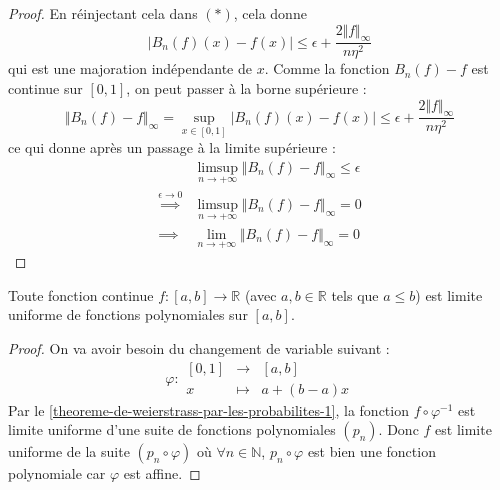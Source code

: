 \begin{proof}
    En réinjectant cela dans $(*)$, cela donne
    \[ |B_n(f)(x) - f(x)| \leq \epsilon + \frac{2 \Vert f \Vert_\infty}{n \eta^2} \]
    qui est une majoration indépendante de $x$. Comme la fonction $B_n(f) - f$ est continue sur $[0, 1]$, on peut passer à la borne supérieure :
    \[ \Vert B_n(f) - f \Vert_\infty = \sup_{x \in [0, 1]} |B_n(f)(x) - f(x)| \leq \epsilon + \frac{2 \Vert f \Vert_\infty}{n \eta^2} \]
    ce qui donne après un passage à la limite supérieure :
    \begin{align*}
      &\limsup_{n \rightarrow +\infty} \Vert B_n(f) - f \Vert_\infty \leq \epsilon \\
      \overset{\epsilon \longrightarrow 0}{\implies} &\limsup_{n \rightarrow +\infty} \Vert B_n(f) - f \Vert_\infty = 0 \\
      \implies &\lim_{n \rightarrow +\infty} \Vert B_n(f) - f \Vert_\infty = 0
    \end{align*}
  \end{proof}

  \begin{theorem}
    Toute fonction continue $f : [a,b] \rightarrow \mathbb{R}$ (avec $a, b \in \mathbb{R}$ tels que $a \leq b$) est limite uniforme de fonctions polynomiales sur $[a, b]$.
  \end{theorem}

  \begin{proof}
    On va avoir besoin du changement de variable suivant :
    \[ \varphi :
    \begin{array}{ccc}
      [0,1] &\rightarrow& [a, b] \\
      x &\mapsto& a + (b-a) x
    \end{array}
    \]
    Par le \cref{theoreme-de-weierstrass-par-les-probabilites-1}, la fonction $f \circ \varphi^{-1}$ est limite uniforme d'une suite de fonctions polynomiales $(p_n)$. Donc $f$ est limite uniforme de la suite $(p_n \circ \varphi)$ où $\forall n \in \mathbb{N}$, $p_n \circ \varphi$ est bien une fonction polynomiale car $\varphi$ est affine.
  \end{proof}

